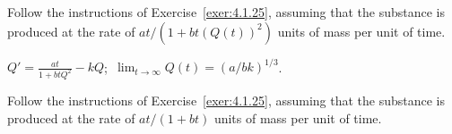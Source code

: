 \documentclass{ximera}
\begin{document}
\begin{problem}\label{exer:4.1.26}  
Follow the instructions of Exercise~\ref{exer:4.1.25}, assuming that
the substance is produced at the rate of   $at/(1+bt(Q(t))^2)$
units of mass per unit of time.
\begin{solution}
$Q'=\frac{at}{1+btQ^2}-kQ$;\  $\lim_{t\to\infty}Q(t)=(a/bk)^{1/3}$.
\end{solution}
\end{problem}

\begin{problem}\label{exer:4.1.27}  
Follow the instructions of Exercise~\ref{exer:4.1.25}, assuming that
the substance is produced at the rate of   $at/(1+bt)$
units of mass per unit of time.
\end{problem}
\end{document}
